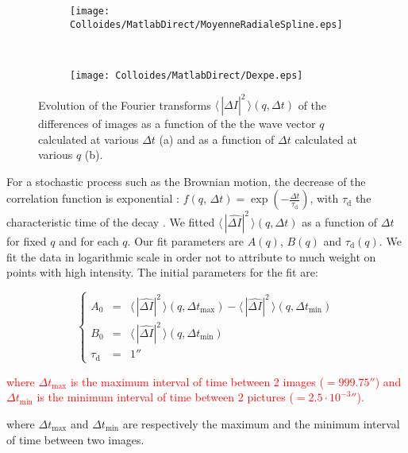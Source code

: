 \documentclass[%
 aip,
 jmp,%
 amsmath,amssymb,
reprint,%
]{revtex4-1}
\begin{document}
\begin{figure}[H]
\centering
	\begin{subfigure}[b]{\linewidth}
		\centering
		\texttt{[image: Colloides/MatlabDirect/MoyenneRadialeSpline.eps]}		
	\end{subfigure}
	\\
	\begin{subfigure}[b]{\linewidth}
		\centering
		\texttt{[image: Colloides/MatlabDirect/Dexpe.eps]}
	\end{subfigure}
	\caption{Evolution of the Fourier transforms $\langle \, |\widehat{\Delta I}|^2 \, \rangle (q, \Delta t)$ of the differences of images as a function of the the wave vector $q$ calculated at various $\Delta t$ (a) and as a function of $\Delta t$ calculated at various $q$ (b).}
	\label{D}
\end{figure}

For a stochastic process such as the Brownian motion, the decrease of the correlation function is exponential : $ f(q, \, \Delta t) = \exp(-\frac{\Delta t}{\tau_\text{d}})$, with $\tau_\text{d}$ the characteristic time of the decay \citep{8_berne2000dynamic}. We fitted $\langle \, |\widehat{\Delta I}|^2 \, \rangle (q, \Delta t)$ as a function of $\Delta t$ for fixed $q$ and for each $q$. Our fit parameters are $A(q)$, $B(q)$ and $\tau_\text{d}(q)$. We fit the data in logarithmic scale in order not to attribute to much weight on points with high intensity. The initial parameters for the fit are:

\begin{equation}
\left\{
\begin{array}{rcl}
A_0 &=& \langle \, |\widehat{\Delta I}|^2 \, \rangle (q,\Delta t_\text{max}) - \langle \, |\widehat{\Delta I}|^2 \, \rangle (q,\Delta t_\text{min}) \\
B_0 &=& \langle \, |\widehat{\Delta I}|^2 \, \rangle (q,\Delta t_\text{min}) \\
\tau_\text{d} &=& \unit{1}{\second}
\end{array}
\right.
\end{equation}

\textcolor{red}{where $\Delta t_\text{max}$ is the maximum interval of time between 2 images ($ = \unit{999.75}{\second}$) and $\Delta t_\text{min}$ is the minimum interval of time between 2 pictures ($ = \unit{2.5\cdot10^{-3}}{\second}$).}

where $\Delta t_\text{max}$ and $\Delta t_\text{min}$ are respectively the maximum and the minimum interval of time between two images.
\end{document}
